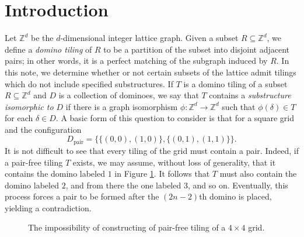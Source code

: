 \section{Introduction}

Let $\mathbb{Z}^d$ be the $d$-dimensional integer lattice graph.
Given a subset $R \subseteq \mathbb{Z}^d$, we define a \emph{domino tiling} of $R$ to be a partition of the subset into disjoint adjacent pairs; in other words, it is a perfect matching of the subgraph induced by $R$.
In this note, we determine whether or not certain subsets of the lattice admit tilings which do not include specified substructures.
If $T$ is a domino tiling of a subset $R \subseteq \mathbb{Z}^d$ and $D$ is a collection of dominoes, we say that $T$ contains a \emph{substructure isomorphic to $D$} if there is a graph isomorphism $\phi \colon \mathbb{Z}^d \to \mathbb{Z}^d$ such that $\phi(\delta) \in T$ for each $\delta \in D$. A basic form of this question to consider is that for a square grid and the  configuration
\begin{equation}
  D_\mathrm{pair} = \Big\{\{(0, 0), (1, 0)\}, \{(0, 1), (1, 1)\}\Big\}. 
\end{equation}
It is not difficult to see that every tiling of the grid must contain a pair.
Indeed, if a pair-free tiling $T$ exists, we may assume, without loss of generality, that it contains the domino labeled $1$ in Figure \ref{fig:impossible-grid}.
It follows that $T$ must also contain the domino labeled $2$, and from there the one labeled $3$, and so on. 
Eventually, this process forces a pair to be formed after the $(2n - 2)$th domino is placed, yielding a contradiction. 

\begin{figure}[h]
  \centering
  \caption{The impossibility of constructing of pair-free tiling of a $4 \times 4$ grid.}\label{fig:impossible-grid}
\end{figure}

